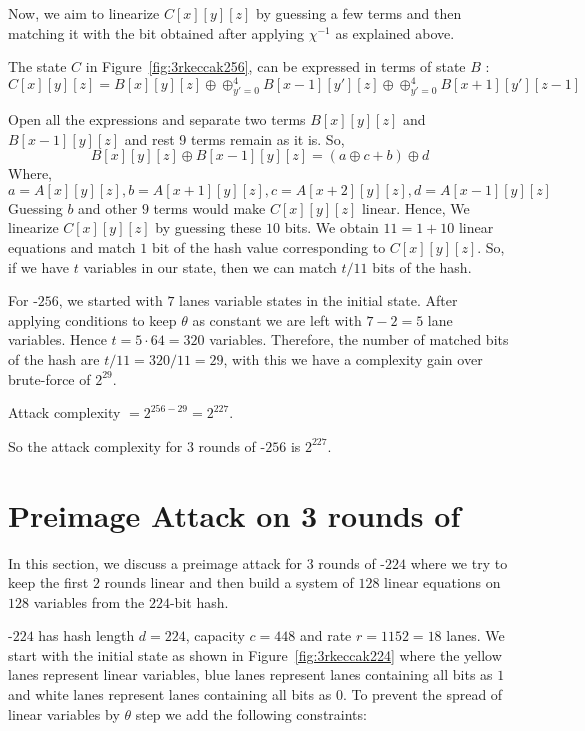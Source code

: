 Now, we aim to linearize $C[x][y][z]$ by guessing a few terms and then matching it with the bit obtained after applying $\chi^{-1}$ as explained above.

The state $C$ in Figure~\ref{fig:3rkeccak256}, can be expressed in terms of state $B$ :
\[
    C[x][y][z] = B[x][y][z] \oplus \oplus_{y' = 0}^{4} B[x-1][y'][z] \oplus \oplus_{y' = 0}^{4} B[x+1][y'][z-1]
\]

Open all the expressions and separate two terms $B[x][y][z]$ and $B[x-1][y][z]$ and rest 9 terms remain as it is.
So, \[ B[x][y][z] \oplus B[x-1][y][z] = (a \oplus c + b) \oplus d
    \]
Where,
\[
    a = A[x][y][z], b = A[x + 1][y][z], c = A[x + 2][y][z], d = A[x - 1][y][z]
\]
Guessing $b$ and other $9$ terms would make $C[x][y][z]$ linear. Hence, We linearize $C[x][y][z]$ by guessing these $10$ bits. We obtain $11 = 1 + 10$ linear equations and match $1$ bit of the hash value corresponding to $C[x][y][z]$. So, if we have $t$ variables in our state, then we can match $t/11$ bits of the hash.

For \Keccak-$256$, we started with $7$ lanes variable states in the initial state. After applying conditions to keep $\theta$ as constant we are left with $7 - 2 = 5$ lane variables. Hence $t = 5 \cdot 64 = 320$ variables.
Therefore, the number of matched bits of the hash are $t/11 = 320/11 = 29$, with this we have a complexity gain over brute-force of $2^{29}$.

Attack complexity $ = 2^{256 - 29} = 2^{227}$.

So the attack complexity for $3$ rounds of \KECCAK{}-$256$ is $2^{227}$.

\section{Preimage Attack on 3 rounds of }

In this section, we discuss a preimage attack for $3$ rounds of \KECCAK{}-$224$ where we try to keep the first $2$ rounds linear and then build a system of $128$ linear equations on $128$ variables from the $224$-bit hash.

\KECCAK{}-$224$ has hash length $d=224$, capacity $c=448$ and rate $r = 1152 = 18$ lanes. We start with the initial state as shown in Figure~\ref{fig:3rkeccak224} where the yellow lanes represent linear variables, blue lanes represent lanes containing all bits as $1$ and white lanes represent lanes containing all bits as $0$. To prevent the spread of linear variables by $\theta$ step we add the following constraints:

